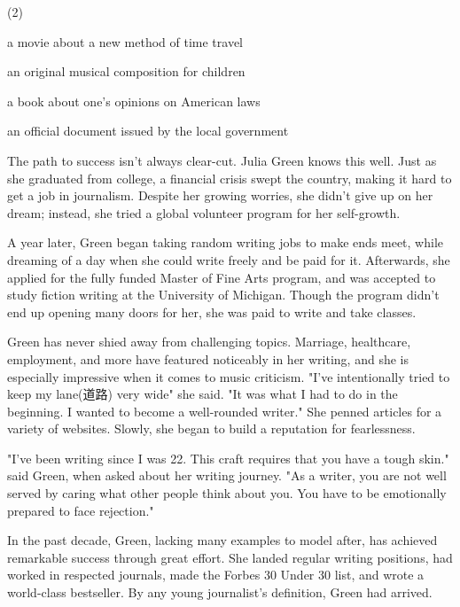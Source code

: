 \documentclass{英语试卷}
\begin{document}
\begin{choices}(2)
  \item a movie about a new method of time travel
  \item an original musical composition for children
  \item a book about one's opinions on American laws
  \item an official document issued by the local government
\end{choices}
\par The path to success isn't always clear-cut. Julia Green knows this well. Just as she graduated from college, a financial crisis swept the country, making it hard to get a job in journalism. Despite her growing worries, she didn't give up on her dream; instead, she tried a global volunteer program for her self-growth.\par
\par A year later, Green began taking random writing jobs to make ends meet, while dreaming of a day when she could write freely and be paid for it. Afterwards, she applied for the fully funded Master of Fine Arts program, and was accepted to study fiction writing at the University of Michigan. Though the program didn't end up opening many doors for her, she was paid to write and take classes.\par
\par Green has never shied away from challenging topics. Marriage, healthcare, employment, and more have featured noticeably in her writing, and she is especially impressive when it comes to music criticism. "I’ve intentionally tried to keep my lane(道路) very wide" she said. "It was what I had to do in the beginning. I wanted to become a well-rounded writer." She penned articles for a variety of websites. Slowly, she began to build a reputation for fearlessness.\par
\par "I've been writing since I was 22. This craft requires that you have a tough skin." said Green, when asked about her writing journey. "As a writer, you are not well served by caring what other people think about you. You have to be emotionally prepared to face rejection."\par
\par In the past decade, Green, lacking many examples to model after, has achieved remarkable success through great effort. She landed regular writing positions, had worked in respected journals, made the Forbes 30 Under 30 list, and wrote a world-class bestseller. By any young journalist's definition, Green had arrived.\par
\end{document}
